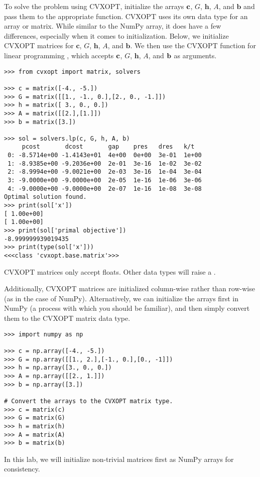 To solve the problem using CVXOPT, initialize the arrays $\mathbf{c}$, $G$, $\mathbf{h}$, $A$, and $\mathbf{b}$ and pass them to the appropriate function.
CVXOPT uses its own data type for an array or matrix. 
While similar to the NumPy array, it does have a few differences, especially when it comes to initialization.
Below, we initialize CVXOPT matrices for $\mathbf{c}$, $G$, $\mathbf{h}$, $A$, and $\mathbf{b}$.
We then use the CVXOPT function for linear programming , which accepts $\mathbf{c}$, $G$, $\mathbf{h}$, $A$, and $\mathbf{b}$ as arguments.

\begin{lstlisting}
>>> from cvxopt import matrix, solvers

>>> c = matrix([-4., -5.])
>>> G = matrix([[1., -1., 0.],[2., 0., -1.]])
>>> h = matrix([ 3., 0., 0.])
>>> A = matrix([[2.],[1.]])
>>> b = matrix([3.])

>>> sol = solvers.lp(c, G, h, A, b)
     pcost       dcost       gap    pres   dres   k/t
 0: -8.5714e+00 -1.4143e+01  4e+00  0e+00  3e-01  1e+00
 1: -8.9385e+00 -9.2036e+00  2e-01  3e-16  1e-02  3e-02
 2: -8.9994e+00 -9.0021e+00  2e-03  3e-16  1e-04  3e-04
 3: -9.0000e+00 -9.0000e+00  2e-05  1e-16  1e-06  3e-06
 4: -9.0000e+00 -9.0000e+00  2e-07  1e-16  1e-08  3e-08
Optimal solution found.
>>> print(sol['x'])
[ 1.00e+00]
[ 1.00e+00]
>>> print(sol['primal objective'])
-8.999999939019435
>>> print(type(sol['x']))
<<<class 'cvxopt.base.matrix'>>>
\end{lstlisting}

\begin{warn}
CVXOPT matrices only accept floats. 
Other data types will raise a .

Additionally, CVXOPT matrices are initialized column-wise rather than row-wise (as in the case of NumPy).
Alternatively, we can initialize the arrays first in NumPy (a process with which you should be familiar),
and then simply convert them to the CVXOPT matrix data type.
\begin{lstlisting}
>>> import numpy as np

>>> c = np.array([-4., -5.])
>>> G = np.array([[1., 2.],[-1., 0.],[0., -1]])
>>> h = np.array([3., 0., 0.])
>>> A = np.array([[2., 1.]])
>>> b = np.array([3.])

# Convert the arrays to the CVXOPT matrix type.
>>> c = matrix(c)
>>> G = matrix(G)
>>> h = matrix(h)
>>> A = matrix(A)
>>> b = matrix(b)
\end{lstlisting}
In this lab, we will initialize non-trivial matrices first as NumPy arrays for consistency.

\end{warn}

